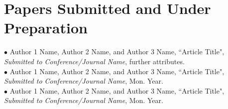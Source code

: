 

%
\chapter*{\thechapter \quad Papers Submitted and Under Preparation}

$\bullet$ Author 1 Name, Author 2 Name, and Author 3 Name, {``Article Title"}, \emph{Submitted to Conference/Journal Name}, further attributes.\\
$\bullet$ Author 1 Name, Author 2 Name, and Author 3 Name, {``Article Title"}, \emph{Submitted to Conference/Journal Name}, Mon. Year. \\
$\bullet$ Author 1 Name, Author 2 Name, and Author 3 Name, {``Article Title"}, \emph{Submitted to Conference/Journal Name}, Mon. Year.

